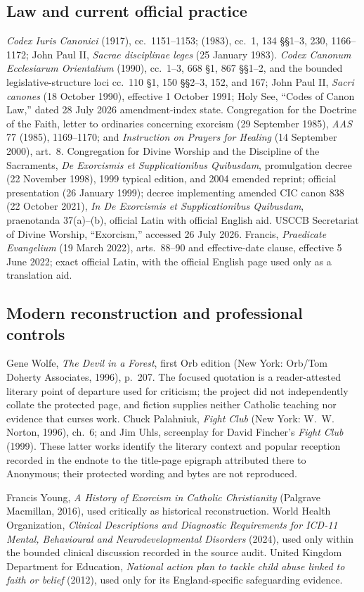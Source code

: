 \subsection{Law and current official practice}

\emph{Codex Iuris Canonici} (1917), cc.~1151--1153; (1983), cc.~1,
134 \S\S1--3, 230, 1166--1172; John Paul II, \emph{Sacrae disciplinae leges}
(25 January 1983).
\emph{Codex Canonum Ecclesiarum Orientalium} (1990), cc.~1--3,
668 \S1, 867 \S\S1--2, and the bounded legislative-structure loci
cc.~110 \S1, 150 \S\S2--3, 152, and 167; John Paul II,
\emph{Sacri canones} (18 October 1990), effective 1 October 1991; Holy See,
``Codes of Canon Law,'' dated 28 July 2026 amendment-index state.
Congregation for the Doctrine of the Faith, letter to ordinaries concerning
exorcism (29 September 1985), \emph{AAS} 77 (1985), 1169--1170; and
\emph{Instruction on Prayers for Healing} (14 September 2000), art.~8.
Congregation for Divine Worship and the Discipline of the Sacraments,
\emph{De Exorcismis et Supplicationibus Quibusdam}, promulgation decree
(22 November 1998), 1999 typical edition, and 2004 emended reprint; official
presentation (26 January 1999); decree implementing amended CIC canon 838
(22 October 2021), \emph{In De Exorcismis et Supplicationibus Quibusdam},
praenotanda 37(a)--(b), official Latin with official English aid. USCCB
Secretariat of Divine Worship, ``Exorcism,'' accessed
26 July 2026.
Francis, \emph{Praedicate Evangelium} (19 March 2022), arts.~88--90 and
effective-date clause, effective 5 June 2022; exact official Latin, with the
official English page used only as a translation aid.

\subsection{Modern reconstruction and professional controls}

Gene Wolfe, \emph{The Devil in a Forest}, first Orb edition (New York:
Orb/Tom Doherty Associates, 1996), p.~207. The focused quotation is a
reader-attested literary point of departure used for criticism; the project
did not independently collate the protected page, and fiction supplies neither
Catholic teaching nor evidence that curses work. Chuck Palahniuk,
\emph{Fight Club} (New York: W.~W. Norton, 1996), ch.~6; and Jim Uhls,
screenplay for David Fincher's \emph{Fight Club} (1999). These latter works
identify the literary context and popular reception recorded in the endnote
to the title-page epigraph attributed there to Anonymous; their protected
wording and bytes are not reproduced.

Francis Young, \emph{A History of Exorcism in Catholic Christianity}
(Palgrave Macmillan, 2016), used critically as historical reconstruction.
World Health Organization, \emph{Clinical Descriptions and Diagnostic
Requirements for ICD-11 Mental, Behavioural and Neurodevelopmental Disorders}
(2024), used only within the bounded clinical discussion recorded in the
source audit. United Kingdom Department for Education, \emph{National action
plan to tackle child abuse linked to faith or belief} (2012), used only for its
England-specific safeguarding evidence.
